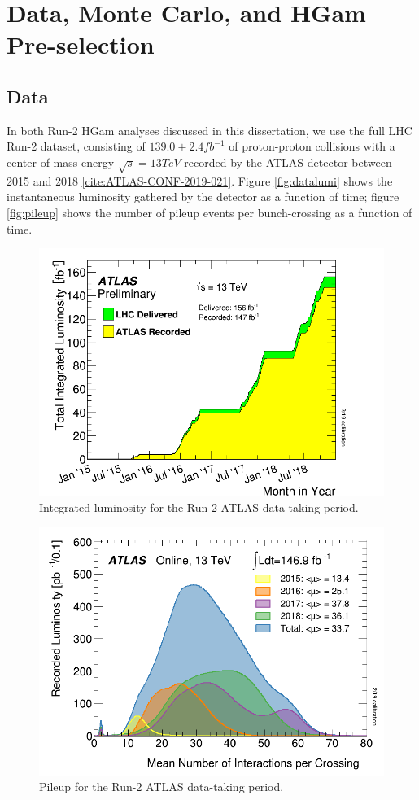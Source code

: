 \section{Data, Monte Carlo, and HGam Pre-selection} \label{sec:DataMC}

\subsection{Data} \label{sec:Data}

In both Run-2 HGam analyses discussed in this dissertation, we use the full LHC Run-2 dataset, consisting of $139.0 \pm 2.4 fb^{-1}$ of proton-proton collisions with a center of mass energy $\sqrt{s} = 13 TeV$ recorded by the ATLAS detector between 2015 and 2018 \ref{cite:ATLAS-CONF-2019-021}. Figure \ref{fig:datalumi} shows the instantaneous luminosity gathered by the detector as a function of time; figure \ref{fig:pileup} shows the number of pileup events per bunch-crossing as a function of time. 

\begin{figure}
\includegraphics[width=0.5\linewidth]{figures/datamc_chapter/datalumi.png}
\caption{Integrated luminosity for the Run-2 ATLAS data-taking period.}
\end{figure}

\begin{figure}
\includegraphics[width=0.5\linewidth]{figures/datamc_chapter/pileup.png}
\caption{Pileup for the Run-2 ATLAS data-taking period.}
\end{figure}

